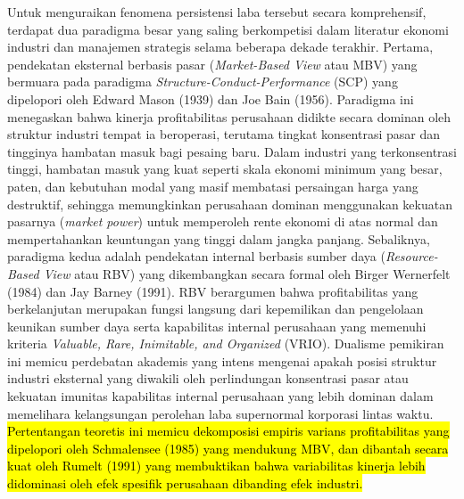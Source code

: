 \documentclass[12pt,a4paper]{article}
\begin{document}
Untuk menguraikan fenomena persistensi laba tersebut secara
komprehensif, terdapat dua paradigma besar yang saling berkompetisi
dalam literatur ekonomi industri dan manajemen strategis selama beberapa
dekade terakhir. Pertama, pendekatan eksternal berbasis pasar
(\emph{Market-Based View} atau MBV) yang bermuara pada paradigma
\emph{Structure-Conduct-Performance} (SCP) yang dipelopori oleh Edward
Mason (1939) dan Joe Bain (1956). Paradigma ini menegaskan bahwa kinerja
profitabilitas perusahaan didikte secara dominan oleh struktur industri
tempat ia beroperasi, terutama tingkat konsentrasi pasar dan tingginya
hambatan masuk bagi pesaing baru. Dalam industri yang terkonsentrasi
tinggi, hambatan masuk yang kuat seperti skala ekonomi minimum yang
besar, paten, dan kebutuhan modal yang masif membatasi persaingan harga
yang destruktif, sehingga memungkinkan perusahaan dominan menggunakan
kekuatan pasarnya (\emph{market power}) untuk memperoleh rente ekonomi
di atas normal dan mempertahankan keuntungan yang tinggi dalam jangka
panjang. Sebaliknya, paradigma kedua adalah pendekatan internal berbasis
sumber daya (\emph{Resource-Based View} atau RBV) yang dikembangkan
secara formal oleh Birger Wernerfelt (1984) dan Jay Barney (1991). RBV
berargumen bahwa profitabilitas yang berkelanjutan merupakan fungsi
langsung dari kepemilikan dan pengelolaan keunikan sumber daya serta
kapabilitas internal perusahaan yang memenuhi kriteria \emph{Valuable,
Rare, Inimitable, and Organized} (VRIO). Dualisme pemikiran ini memicu
perdebatan akademis yang intens mengenai apakah posisi struktur industri
eksternal yang diwakili oleh perlindungan konsentrasi pasar atau
kekuatan imunitas kapabilitas internal perusahaan yang lebih dominan
dalam memelihara kelangsungan perolehan laba supernormal korporasi
lintas waktu.
\hl{Pertentangan teoretis ini memicu dekomposisi empiris varians profitabilitas yang dipelopori oleh Schmalensee (1985) yang mendukung MBV, dan dibantah secara kuat oleh Rumelt (1991) yang membuktikan bahwa variabilitas kinerja lebih didominasi oleh efek spesifik perusahaan dibanding efek industri.}
\end{document}
